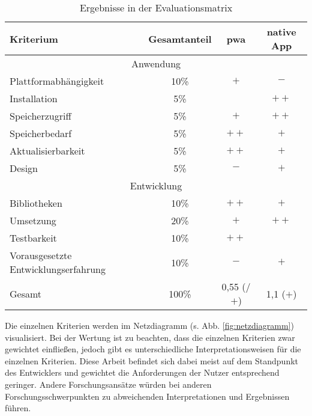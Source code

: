  \newpage

\begin{table}[t!]
	\centering
	\begin{tabular}{|l|c|c|c|}
		\hline
		Kriterium              & Gesamtanteil & \cellcolor{green!25}\ac{pwa} & \cellcolor{blue!25} native App\\
		
		\hline
		\multicolumn{4}{c}{Anwendung}         \\
		\hline
		Plattformabhängigkeit   & 10\%         & \cellcolor{green!25}$+$ &\cellcolor{blue!25}$-$\\
		Installation           & 5\%          & \cellcolor{green!25}\Circle & \cellcolor{blue!25}$++$ \\
		Speicherzugriff        & 5\%          & \cellcolor{green!25}$+$&\cellcolor{blue!25}$++$ \\
		Speicherbedarf         & 5\%          &\cellcolor{green!25}$++$&\cellcolor{blue!25}$+$\\
		Aktualisierbarkeit     & 5\%          &\cellcolor{green!25}$++$&\cellcolor{blue!25}$+$ \\
		Design & 5\%         & \cellcolor{green!25}$-$&\cellcolor{blue!25}$+$\\
		
		\hline
		\multicolumn{4}{c}{Entwicklung}      \\
		\hline
		Bibliotheken           & 10\%         &\cellcolor{green!25}$++$&\cellcolor{blue!25}$+$ \\
		Umsetzung              & 20\%         &\cellcolor{green!25}$+$&\cellcolor{blue!25}$++$ \\
		Testbarkeit            & 10\%         &\cellcolor{green!25}$++$&\cellcolor{blue!25}\Circle\\
		Vorausgesetzte Entwicklungserfahrung    & 10\%  &\cellcolor{green!25}$-$&\cellcolor{blue!25}$+$ \\
		\hline
		\hline
		Gesamt                  & 100\%        & \cellcolor{green!25}0,55 (\Circle/$+$) &\cellcolor{blue!25}1,1 ($+$)\\
		\hline
	\end{tabular}
	\caption{Ergebnisse in der Evaluationsmatrix} \label{tab:evaluationsmatrix_ausgefüllt}
\end{table}


\newpage

Die einzelnen Kriterien werden im Netzdiagramm (s. Abb. \ref{fig:netzdiagramm}) visualisiert. Bei der Wertung ist zu beachten, dass die einzelnen Kriterien zwar gewichtet einfließen, jedoch gibt es unterschiedliche Interpretationsweisen für die einzelnen Kriterien. Diese Arbeit befindet sich dabei meist auf dem Standpunkt des Entwicklers und gewichtet die Anforderungen der Nutzer entsprechend geringer. Andere Forschungsansätze würden bei anderen Forschungsschwerpunkten zu abweichenden Interpretationen und Ergebnissen führen.

